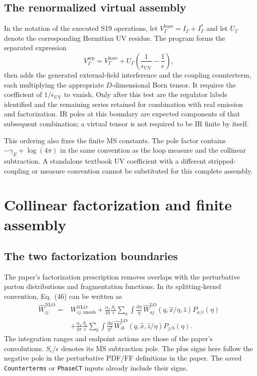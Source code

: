 \documentclass[11pt,a4paper]{article}
\newcommand{\dd}{\mathrm{d}}
\newcommand{\eps}{\epsilon}
\newcommand{\MSbar}{\overline{\mathrm{MS}}}
\newcommand{\What}{\widehat W}
\newcommand{\NLO}{\mathrm{NLO}}
\newcommand{\LO}{\mathrm{LO}}
\begin{document}
\subsection{The renormalized virtual assembly}

In the notation of the executed S19 operations, let
$V_\Gamma^{\mathrm{bare}}=I_\Gamma+I_\Gamma^*$ and let
$U_\Gamma$ denote the corresponding Hermitian UV residue. The program
forms the separated expression
\begin{equation}
 V_\Gamma^{\mathrm{sep}}
 =V_\Gamma^{\mathrm{bare}}+
 U_\Gamma\left(\frac{1}{\eps_{\mathrm{UV}}}-\frac{1}{\eps}\right),
 \label{eq:uvseparation}
\end{equation}
then adds the generated external-field interference and the coupling
counterterm, each multiplying the appropriate $D$-dimensional Born
tensor. It requires the coefficient of $1/\eps_{\mathrm{UV}}$ to
vanish. Only after this test are the regulator labels identified and
the remaining series retained for combination with real emission and
factorization. IR poles at this boundary are expected components of
that subsequent combination; a virtual tensor is not required to be
IR finite by itself.

This ordering also fixes the finite $\MSbar$ constants. The pole factor
contains $-\gamma_E+\log(4\pi)$ in the same convention as the loop
measure and the collinear subtraction. A standalone textbook UV
coefficient with a different stripped-coupling or measure convention
cannot be substituted for this complete assembly.

\section{Collinear factorization and finite assembly}
\label{sec:factorization}

\subsection{The two factorization boundaries}

The paper's factorization prescription removes overlaps with the
perturbative parton distributions and fragmentation functions. In its
splitting-kernel convention, Eq.~(46) can be written as
\begin{align}
 \What^{\NLO}_{ij}
 ={}&W^{\NLO}_{ij,\mathrm{unsub}}
 +\frac{\alpha_s}{4\pi}\frac{S_\eps}{\eps}
   \sum_a\int\frac{\dd\eta}{\eta}\,
       \What^{\LO}_{aj}(q,\hat x/\eta,\hat z)P_{a/i}(\eta)
 \nonumber\\
 &+\frac{\alpha_s}{4\pi}\frac{S_\eps}{\eps}
   \sum_b\int\frac{\dd\eta}{\eta^2}\,
       \What^{\LO}_{ib}(q,\hat x,\hat z/\eta)P_{j/b}(\eta).
 \label{eq:factorization}
\end{align}
The integration ranges and endpoint actions are those of the paper's
convolutions. $S_\eps/\eps$ denotes its $\MSbar$ subtraction pole.
The plus signs here follow the negative pole in the perturbative PDF/FF
definitions in the paper. The saved \texttt{Counterterms} or
\texttt{PhaseCT} inputs already include their signs.
\end{document}
